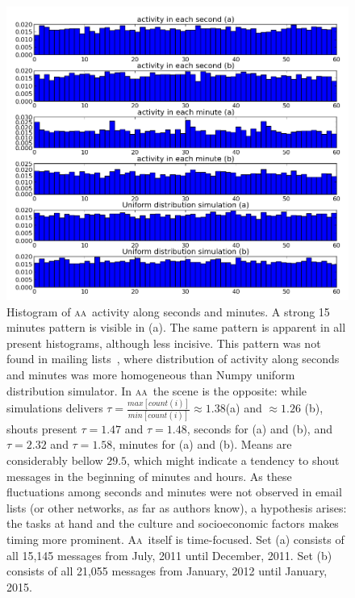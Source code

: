 \documentclass[a4paper, 11pt]{article} %
\newcommand{\aab}{\textsc{aa}}
\newcommand{\aai}{\textsc{Aa}}
\begin{document}
\begin{figure}[H]
    \hspace{-25mm}
    \includegraphics[width=1.3\textwidth]{imgs/segMinHist}
    \caption{\small Histogram of \aab\ activity along seconds and minutes. A strong 15 minutes pattern is visible in (a). The same pattern is apparent in all present histograms, although less incisive. This pattern was not found in mailing lists~\cite{rc1}, where distribution of activity along seconds and minutes was more homogeneous than Numpy uniform distribution simulator. In \aab\ the scene is the opposite: while simulations delivers $\tau=\frac{max[count(i)]}{min[count(i)]}\approx1.38$(a) and $\approx 1.26$ (b), shouts present $\tau=1.47$ and $\tau=1.48$, seconds for (a) and (b), and$\tau=2.32$ and $\tau=1.58$, minutes for (a) and (b). Means are considerably bellow $29.5$, which might indicate a tendency to shout messages in the beginning of minutes and hours. As these fluctuations among seconds and minutes were not observed in email lists (or other networks, as far as authors know), a hypothesis arises: the tasks at hand and the culture and socioeconomic factors makes timing more prominent. \aai\ itself is time-focused. Set (a) consists of all 15,145 messages from July, 2011 until December, 2011. Set (b) consists of all 21,055 messages from January, 2012 until January, 2015.}\label{fig:histSecMin}
\end{figure}
\end{document}
